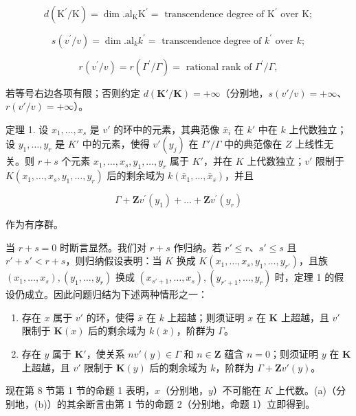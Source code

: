 \[
d \left(\mathrm{K} ^ {\prime} / \mathrm{K}\right) = \dim . \mathrm{al} _ {\mathrm{K}} \mathrm{K} ^ {\prime} = \text { transcendence   degree   of } \mathrm{K} ^ {\prime} \text { over } \mathrm{K};
\]

\[
s (v ^ {\prime} / v) = \dim . \mathrm{al} _ {k} k ^ {\prime} = \text { transcendence   degree   of } k ^ {\prime} \text { over } k;
\]

\[
r (v ^ {\prime} / v) = r (\Gamma^ {\prime} / \Gamma) = \text { rational   rank   of } \Gamma^ {\prime} / \Gamma ,
\]

若等号右边各项有限；否则约定 \(d(\mathbf{K}' / \mathbf{K}) = +\infty\)（分别地，\(s(v' / v) = +\infty\)、\(r(v' / v) = +\infty\)）。

定理 1. 设 \(x_1, \ldots, x_s\) 是 \(v'\) 的环中的元素，其典范像 \(\bar{x}_i\) 在 \(k'\) 中在 \(k\) 上代数独立；设 \(y_1, \ldots, y_r\) 是 \(K'\) 中的元素，使得 \(v'(y_j)\) 在 \(\Gamma'/\Gamma\) 中的典范像在 \(Z\) 上线性无关。则 \(r + s\) 个元素 \(x_1, \ldots, x_s, y_1, \ldots, y_r\) 属于 \(K'\)，并在 \(K\) 上代数独立；\(v'\) 限制于 \(K(x_1, \ldots, x_s, y_1, \ldots, y_r)\) 后的剩余域为 \(k(\bar{x}_1, \ldots, \bar{x}_s)\)，并且

\[
\Gamma + \mathbf {Z} v ^ {\prime} (y _ {1}) + \dots + \mathbf {Z} v ^ {\prime} (y _ {r})
\]

作为有序群。

当 \(r + s = 0\) 时断言显然。我们对 \(r + s\) 作归纳。若 \(r' \leqslant r\)、\(s' \leqslant s\) 且 \(r' + s' < r + s\)，则归纳假设表明：当 \(K\) 换成 \(K(x_1, \ldots, x_s, y_1, \ldots, y_{r'})\)，且族 \((x_1, \ldots, x_s), (y_1, \ldots, y_r)\) 换成 \((x_{s'+1}, \ldots, x_s), (y_{r'+1}, \ldots, y_r)\) 时，定理 1 的假设仍成立。因此问题归结为下述两种情形之一：

\begin{enumerate}
\def\labelenumi{(\alph{enumi})}
\item
  存在 \(x\) 属于 \(v'\) 的环，使得 \(\bar{x}\) 在 \(k\) 上超越；则须证明 \(x\) 在 \(\mathbf{K}\) 上超越，且 \(v'\) 限制于 \(\mathbf{K}(x)\) 后的剩余域为 \(k(\bar{x})\)，阶群为 \(\Gamma\)。
\item
  存在 \(y\) 属于 \(\mathbf{K}'\)，使关系 \(nv'(y) \in \Gamma\) 和 \(n \in \mathbf{Z}\) 蕴含 \(n = 0\)；则须证明 \(y\) 在 \(\mathbf{K}\) 上超越，且 \(v'\) 限制于 \(\mathbf{K}(y)\) 后的剩余域为 \(k\)，阶群为 \(\Gamma + \mathbf{Z}v'(y)\)。
\end{enumerate}

现在第 8 节第 1 节的命题 1 表明，\(x\)（分别地，\(y\)）不可能在 \(K\) 上代数。(a)（分别地，(b)）的其余断言由第 1 节的命题 2（分别地，命题 1）立即得到。

